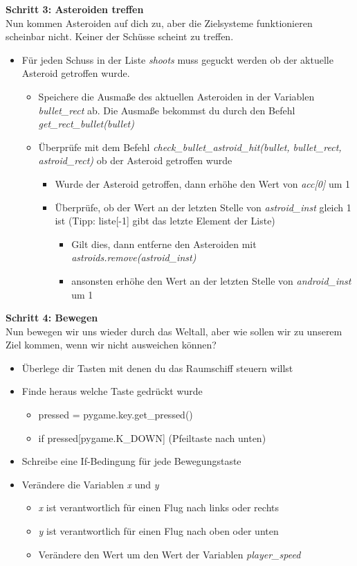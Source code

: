 \textbf{Schritt 3: Asteroiden treffen}\\
Nun kommen Asteroiden auf dich zu, aber die Zielsysteme funktionieren scheinbar nicht. Keiner der Schüsse scheint zu treffen.
\begin{itemize}
	\item Für jeden Schuss in der Liste \textit{shoots} muss geguckt werden ob der aktuelle Asteroid getroffen wurde.
	\begin{itemize}
		\item Speichere die Ausmaße des aktuellen Asteroiden in der Variablen \textit{bullet\_rect} ab. Die Ausmaße bekommst du durch den Befehl \textit{get\_rect\_bullet(bullet)}
		\item Überprüfe mit dem Befehl \textit{check\_bullet\_astroid\_hit(bullet, bullet\_rect, astroid\_rect)} ob der Asteroid getroffen wurde
		\begin{itemize}
			\item Wurde der Asteroid getroffen, dann erhöhe den Wert von \textit{acc[0]} um 1
			\item Überprüfe, ob der Wert an der letzten Stelle von \textit{astroid\_inst} gleich 1 ist (Tipp: liste[-1] gibt das letzte Element der Liste)
			\begin{itemize}
				\item Gilt dies, dann entferne den Asteroiden mit \textit{astroids.remove(astroid\_inst)}
				\item ansonsten erhöhe den Wert an der letzten Stelle von \textit{android\_inst} um 1
			\end{itemize}
		\end{itemize}
	\end{itemize}
\end{itemize}
\textbf{Schritt 4: Bewegen}\\
Nun bewegen wir uns wieder durch das Weltall, aber wie sollen wir zu unserem Ziel kommen, wenn wir nicht ausweichen können?
\begin{itemize}
	\item Überlege dir Tasten mit denen du das Raumschiff steuern willst
	\item Finde heraus welche Taste gedrückt wurde
	\begin{itemize}
		\item pressed = pygame.key.get\_pressed()
		\item if pressed[pygame.K\_DOWN] (Pfeiltaste nach unten)
	\end{itemize}
	\item Schreibe eine If-Bedingung für jede Bewegungstaste
	\item Verändere die Variablen \textit{x} und \textit{y}
	\begin{itemize}
		\item \textit{x} ist verantwortlich für einen Flug nach links oder rechts
		\item \textit{y} ist verantwortlich für einen Flug nach oben oder unten
		\item Verändere den Wert um den Wert der Variablen \textit{player\_speed}
	\end{itemize}	 
\end{itemize}